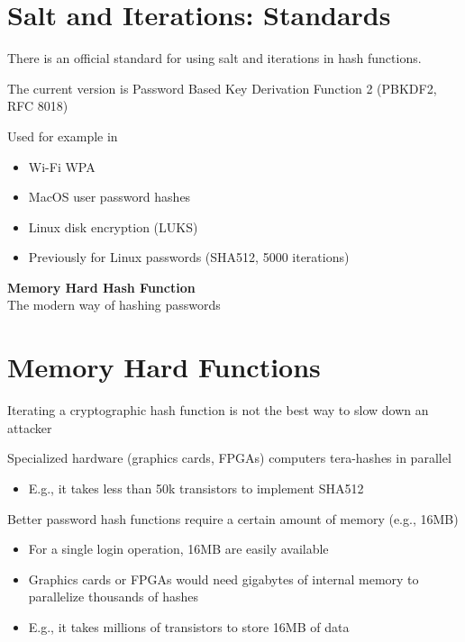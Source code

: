 \documentclass[11pt]{article}
\begin{document}
\section*{Salt and Iterations: Standards}

There is an official standard for using salt and iterations in hash functions. 

The current version is Password Based Key Derivation Function 2 (PBKDF2, RFC 8018)

Used for example in
\begin{itemize}
	\item Wi-Fi WPA
	\item MacOS user password hashes
	\item Linux disk encryption (LUKS)
	\item Previously for Linux passwords (SHA512, 5000 iterations)
\end{itemize}

\vspace{1cm}

\begin{center}
  {\LARGE \textbf{Memory Hard Hash Function}} \\
  The modern way of hashing passwords
\end{center}

\vspace{1cm}

\section*{Memory Hard Functions}

Iterating a cryptographic hash function is not the best way to slow down an attacker

Specialized hardware (graphics cards, FPGAs) computers tera-hashes in parallel
\begin{itemize}
	\item E.g., it takes less than 50k transistors to implement SHA512
\end{itemize}
Better password hash functions require a certain amount of memory (e.g., 16MB)
\begin{itemize}
	\item For a single login operation, 16MB are easily available
	\item Graphics cards or FPGAs would need gigabytes of internal memory to parallelize thousands of hashes
	\item E.g., it takes millions of transistors to store 16MB of data
\end{itemize}
\end{document}
